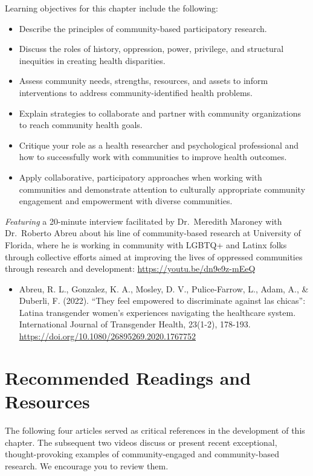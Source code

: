\documentclass[
  11pt,
]{book}
\providecommand{\tightlist}{%
  \setlength{\itemsep}{0pt}\setlength{\parskip}{0pt}}
\begin{document}
Learning objectives for this chapter include the following:

\begin{itemize}
\tightlist
\item
  Describe the principles of community-based participatory research.
\item
  Discuss the roles of history, oppression, power, privilege, and structural inequities in creating health disparities.
\item
  Assess community needs, strengths, resources, and assets to inform interventions to address community-identified health problems.
\item
  Explain strategies to collaborate and partner with community organizations to reach community health goals.
\item
  Critique your role as a health researcher and psychological professional and how to successfully work with communities to improve health outcomes.
\item
  Apply collaborative, participatory approaches when working with communities and demonstrate attention to culturally appropriate community engagement and empowerment with diverse communities.
\end{itemize}

\emph{Featuring} a 20-minute interview facilitated by Dr.~Meredith Maroney with Dr.~Roberto Abreu about his line of community-based research at University of Florida, where he is working in community with LGBTQ+ and Latinx folks through collective efforts aimed at improving the lives of oppressed communities through research and development: \url{https://youtu.be/dn9e9z-mEeQ}

\begin{itemize}
\tightlist
\item
  Abreu, R. L., Gonzalez, K. A., Mosley, D. V., Pulice-Farrow, L., Adam, A., \& Duberli, F. (2022). ``They feel empowered to discriminate against las chicas'': Latina transgender women's experiences navigating the healthcare system. International Journal of Transgender Health, 23(1-2), 178-193. \url{https://doi.org/10.1080/26895269.2020.1767752}
\end{itemize}

\section{Recommended Readings and Resources}\label{recommended-readings-and-resources-2}

The following four articles served as critical references in the development of this chapter. The subsequent two videos discuss or present recent exceptional, thought-provoking examples of community-engaged and community-based research. We encourage you to review them.
\end{document}
